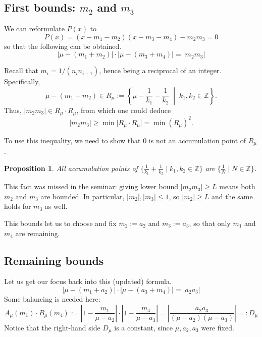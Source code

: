 \documentclass{article}
\theoremstyle{definition}
\theoremstyle{plain}
\newtheorem{proposition}{Proposition}[section]
\theoremstyle{remark}
\numberwithin{equation}{section}
\newcommand{\integer}{\mathbb{Z}}
\begin{document}
\subsection{First bounds: $m_2$ and $m_3$}

We can reformulate $P(x)$ to
\[
  P(x) = (x - m_1 - m_2) (x - m_3 - m_4) - m_2 m_3 = 0
\]
so that the following can be obtained.
\[
  \lvert \mu - (m_1 + m_2) \rvert \cdot \lvert \mu - (m_3 + m_4) \rvert = \lvert m_2 m_3 \rvert
\]

Recall that $m_i = 1 / (n_i n_{i+1})$, hence being a reciprocal of an integer.
Specifically,
\[
  \mu - (m_1 + m_2) \in
  R_\mu := \left\{ \mu - \frac{1}{k_1} - \frac{1}{k_2} \; \middle\vert \; k_1, k_2 \in \integer \right\}.
\]
Thus, $\lvert m_2 m_3 \rvert \in R_\mu \cdot R_\mu$,
from which one could deduce
\[ \lvert m_2 m_3 \rvert \geq \min \lvert R_\mu \cdot R_\mu \rvert = \min(R_\mu)^2. \]

To use this inequality, we need to show that $0$ is not an accumulation point of $R_\mu$.

\begin{proposition}
  All accumulation points of $\{ \frac{1}{k_1} + \frac{1}{k_2} \mid k_1, k_2 \in \integer \}$
  are $\{ \frac{1}{N} \mid N \in \integer \}$.
\end{proposition}


This fact was missed in the seminar:
giving lower bound $\lvert m_2 m_3 \rvert \geq L$ means both $m_2$ and $m_3$ are bounded.
In particular, $\lvert m_2 \rvert, \lvert m_3 \rvert \leq 1$,
so $\lvert m_2 \rvert \geq L$ and the same holds for $m_3$ as well.

This bounds let us to choose and fix $m_2 := a_2$ and $m_3 := a_3$, so that only $m_1$ and $m_4$ are remaining.

\subsection{Remaining bounds}

Let us get our focus back into this (updated) formula.
\[
  \lvert \mu - (m_1 + a_2) \rvert \cdot \lvert \mu - (a_3 + m_4) \rvert = \lvert a_2 a_3 \rvert
\]
Some balancing is needed here:
\[
  A_\mu (m_1) \cdot B_\mu (m_4)
  := \left\lvert 1 - \frac{m_1}{\mu - a_2} \right\rvert \cdot \left\lvert 1 - \frac{m_4}{\mu - a_3} \right\rvert
  = \left\lvert \frac{a_2 a_3}{(\mu - a_2)(\mu - a_3)} \right\rvert =: D_\mu
\]
Notice that the right-hand side $D_\mu$ is a constant, since $\mu, a_2, a_3$ were fixed.
\end{document}
